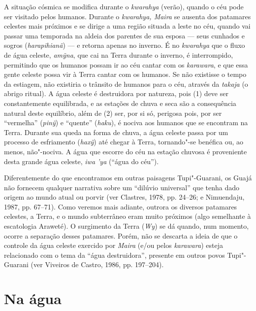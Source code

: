 A situação cósmica se modifica durante o \emph{kwarahya} (verão), quando
o céu pode ser visitado pelos humanos. Durante o \emph{kwarahya, Maira}
se ausenta dos patamares celestes mais próximos e se dirige a uma região
situada a leste no céu, quando vai passar uma temporada na aldeia dos
parentes de sua esposa --- seus cunhados e sogros (\emph{harapihianã}) --- e
retorna apenas no inverno. É no \emph{kwarahya} que o fluxo de água
celeste, \emph{amỹna}, que cai na Terra durante o inverno, é
interrompido, permitindo que os humanos possam ir ao céu cantar com os
\emph{karawara}, e que essa gente celeste possa vir à Terra cantar com
os humanos. Se não existisse o tempo da estiagem, não existiria o
trânsito de humanos para o céu, através da \emph{takaja} (o abrigo
ritual). A água celeste é destruidora por natureza, pois (1) deve ser
constantemente equilibrada, e as estações de chuva e seca são a
consequência natural deste equilíbrio, além de (2) ser, por si só,
perigosa pois, por ser ``vermelha'' (\emph{pinỹ}) e ``quente''
(\emph{haku}), é nociva aos humanos que se encontram na Terra. Durante
sua queda na forma de chuva, a água celeste passa por um processo de
esfriamento (\emph{haxỹ}) até chegar à Terra, tornando"-se benéfica ou,
ao menos, não"-nociva. A água que escorre do céu na estação chuvosa é
proveniente desta grande água celeste, \emph{iwa 'ya} (``água do céu'').

Diferentemente do que encontramos em outras paisagens Tupi"-Guarani, os
Guajá não fornecem qualquer narrativa sobre um ``dilúvio universal'' que
tenha dado origem ao mundo atual ou porvir (ver Clastres, 1978, pp.
24--26; e Nimuendaju, 1987, pp. 67--71). Como veremos mais adiante, outrora
os diversos patamares celestes, a Terra, e o mundo subterrâneo eram
muito próximos (algo semelhante à escatologia Araweté). O surgimento da
Terra (\emph{Wy}) se dá quando, num momento, ocorre a separação desses
patamares. Porém, não se descarta a ideia de que o controle da água
celeste exercido por \emph{Maira} (e/ou pelos \emph{karawara}) esteja
relacionado com o tema da ``água destruidora'', presente em outros povos
Tupi"-Guarani (ver Viveiros de Castro, 1986, pp. 197--204).

\section{Na água}\label{na-uxe1gua}

